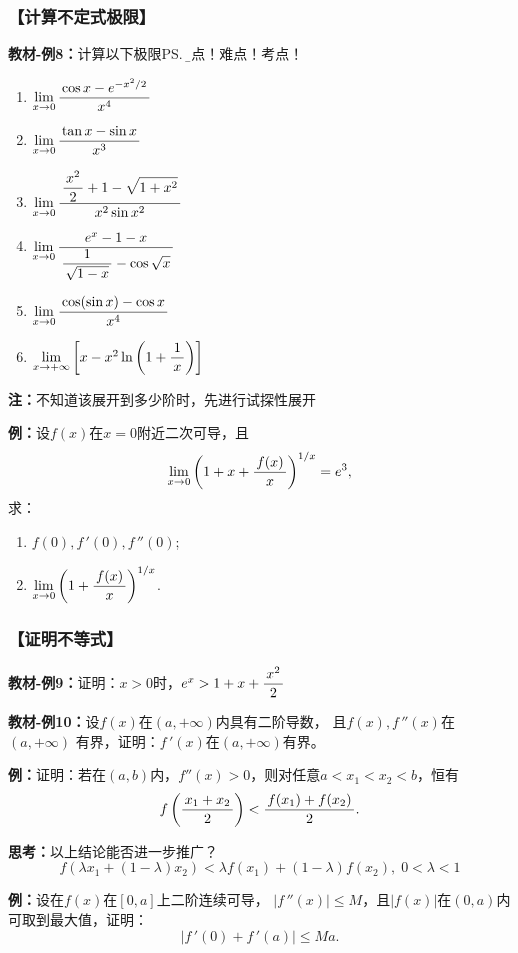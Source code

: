 \subsubsection{【计算不定式极限】}

{\bf 教材-例8：}计算以下极限\ps{\b 重点！难点！考点！}
\begin{enumerate}[(1)]
  \setlength{\itemindent}{1cm}
  \item $\lim\limits_{x\to{0}}\displaystyle\frac{\,{\cos x-e^{-x^2/2}}\,}{\,{x^4}\,}$ 
  \item $\lim\limits_{x\to{0}}\displaystyle\frac{\,{\tan x-\sin x}\,}{\,{x^3}\,}$
  \item $\lim\limits_{x\to{0}}\displaystyle\frac{\,{\displaystyle\frac{\,{x^2}\,}{\,{2}\,}+1-\sqrt{1+x^2}}\,}{\,{x^2\sin x^2}\,}$ 
  \item $\lim\limits_{x\to{0}}\displaystyle\frac{\,{e^x-1-x}\,}{\,{\displaystyle\frac{\,{1}\,}{\,{\sqrt{1-x}}\,}-\cos\sqrt x}\,}$ 
  \item $\lim\limits_{x\to{0}}\displaystyle\frac{\,{\cos(\sin x)-\cos x}\,}{\,{x^4}\,}$
  \item $\lim\limits_{x\to{+\infty}}\left[x-x^2\ln\left(1+\displaystyle\frac{\,{1}\,}{\,{x}\,}\right)\right]$
\end{enumerate}

{\bf 注：}不知道该展开到多少阶时，先进行试探性展开

{\bf 例：}设$f(x)$在$x=0$附近二次可导，且
$$\lim\limits_{x\to{0}}\left(1+x+\displaystyle\frac{\,{f(x)}\,}{\,{x}\,}\right)^{1/x}=e^3,$$
求：
\begin{enumerate}[(1)]
  \setlength{\itemindent}{1cm}
  \item $f(0),f\,'(0),f\,''(0)$;
  \item $\lim\limits_{x\to{0}}\left(1+\displaystyle\frac{\,{f(x)}\,}{\,{x}\,}\right)^{1/x}$.
\end{enumerate}

\subsubsection{【证明不等式】}

{\bf 教材-例9：}证明：$x>0$时，$e^x>1+x+\displaystyle\frac{\,{x^2}\,}{\,{2}\,}$

{\bf 教材-例10：}设$f(x)$在$(a,+\infty)$内具有二阶导数，
且$f(x),f\,''(x)$在$(a,+\infty)$
有界，证明：$f\,'(x)$在$(a,+\infty)$有界。

{\bf 例：}证明：若在$(a,b)$内，$f''(x)>0$，则对任意$a<x_1<x_2<b$，恒有
$$f\left(\displaystyle\frac{\,{x_1+x_2}\,}{\,{2}\,}\right)<\displaystyle\frac{\,{f(x_1)+f(x_2)}\,}{\,{2}\,}.$$

{\bf 思考：}以上结论能否进一步推广？
$${f(\lambda x_1+(1-\lambda)x_2)<\lambda
f(x_1)+(1-\lambda)f(x_2),\;0<\lambda<1}$$

{\bf 例：}设在$f(x)$在$[0,a]$上二阶连续可导，
$|f\,''(x)|\leq M$，且$|f(x)|$在$(0,a)$内可取到最大值，证明：
$$|f\,'(0)+f\,'(a)|\leq Ma.$$

